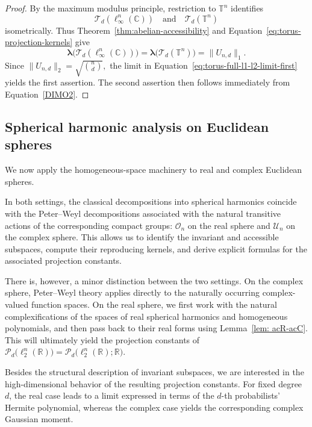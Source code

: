 \documentclass[11pt,showkeys]{amsart}
\begin{document}
\begin{proof}
By the maximum modulus principle, restriction to \(\mathbb T^n\)
identifies
\[
    \mathcal T_d(\ell_\infty^n(\mathbb C))
    \quad\text{and}\quad
    \mathcal T_d(\mathbb T^n)
\]
isometrically. Thus Theorem~\ref{thm:abelian-accessibility} and
Equation~\eqref{eq:torus-projection-kernels} give
\[
    \boldsymbol\lambda\bigl(\mathcal T_d(\ell_\infty^n(\mathbb C))\bigr)
    =
    \boldsymbol\lambda\bigl(\mathcal T_d(\mathbb T^n)\bigr)
    =
    \|U_{n,d}\|_1.
\]
Since
\(
    \|U_{n,d}\|_2
    =
    \sqrt{\binom nd},
\)
the limit in Equation~\eqref{eq:torus-full-l1-l2-limit-first} yields the first assertion.
The second assertion then follows immediately from Equation~\eqref{DIMO2}.
\end{proof}






\subsection{Spherical harmonic analysis on Euclidean spheres}
\label{sec:hilbertian-spheres}

We now apply the homogeneous-space machinery to real and complex Euclidean
spheres.

In both settings, the classical decompositions into spherical harmonics
coincide with the Peter--Weyl decompositions associated with the natural
transitive actions of the corresponding compact groups:
$\mathcal O_n$ on the real sphere and $\mathcal U_n$ on the complex sphere.
This allows us to identify the invariant and accessible subspaces, compute
their reproducing kernels, and derive explicit formulas for the associated
projection constants.

There is, however, a minor distinction between the two settings. On the
complex sphere, Peter--Weyl theory applies directly to the naturally occurring
complex-valued function spaces. On the real sphere, we first work with the
natural complexifications of the spaces of real spherical harmonics and
homogeneous polynomials, and then pass back to their real forms using
Lemma~\ref{lem: acR-acC}. This will ultimately yield the projection constants of
\(
\mathcal P_d\bigl(\ell_2^n(\mathbb R)\bigr)
=
\mathcal P_d\bigl(\ell_2^n(\mathbb R);\mathbb R\bigr).
\)

Besides the structural description of invariant subspaces, we are interested
in the high-dimensional behavior of the resulting projection constants. For
fixed degree $d$, the real case leads to a limit expressed in terms of the
$d$-th probabilists' Hermite polynomial, whereas the complex case yields the
corresponding complex Gaussian moment.
\end{document}
